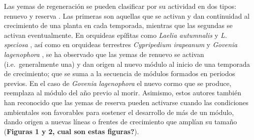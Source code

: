 \documentclass[
]{book}
\theoremstyle{definition}
\theoremstyle{definition}
\theoremstyle{definition}
\theoremstyle{definition}
\theoremstyle{remark}
\begin{document}
Las yemas de regeneración se pueden clasificar por su actividad en dos tipos: renuevo y reserva \citep{rasmussen1995terrestrial}.
Las primeras son aquellas que se activan y dan continuidad al crecimiento de una planta en cada temporada, mientras que las segundas se activan eventualmente.
En orquideas epífitas como \emph{Laelia autumnalis} y \emph{L. speciosa} \citep{emeterio2016usos, hernandez1992dinamica}, así como en orquideas terrestres \emph{Cypripedium irapeanum} y \emph{Govenia lagenophora} \citep{hernandez2012ecological, martinez2024estimation}, se ha observado que las yemas de renuevo se activan (i.e.~generalmente una) y dan origen al nuevo módulo al inicio de una temporada de crecimiento; que se suma a la secuencia de módulos formados en periodos previos.
En el caso de \emph{Govenia lagenophora} el nuevo cormo que se produce, reemplaza al módulo del año previo al morir.
Asimismo, estos autores también han reconocido que las yemas de reserva pueden activarse cuando las condiciones ambientales son favorables para sostener el desarrollo de más de un módulo, dando origen a nuevas líneas o frentes de crecimiento que amplían su tamaño (\textbf{Figuras 1 y 2, cual son estas figuras?}).
\end{document}
